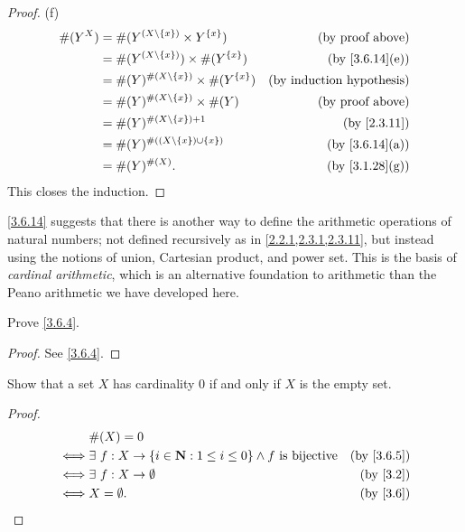\begin{proof}{(f)}
  \begin{align*}
    \#(Y^X) & = \#(Y^{(X \setminus \{x\})} \times Y^{\{x\}})       & \text{(by proof above)}          \\
            & = \#(Y^{(X \setminus \{x\})}) \times \#(Y^{\{x\}})   & \text{(by \cref{3.6.14}(e))}     \\
            & = \#(Y)^{\#(X \setminus \{x\})} \times \#(Y^{\{x\}}) & \text{(by induction hypothesis)} \\
            & = \#(Y)^{\#(X \setminus \{x\})} \times \#(Y)         & \text{(by proof above)}          \\
            & = \#(Y)^{\#(X \setminus \{x\}) + 1}                  & \text{(by \cref{2.3.11})}        \\
            & = \#(Y)^{\#((X \setminus \{x\}) \cup \{x\})}         & \text{(by \cref{3.6.14}(a))}     \\
            & = \#(Y)^{\#(X)}.                                     & \text{(by \cref{3.1.28}(g))}
  \end{align*}
  This closes the induction.
\end{proof}

\begin{remark}\label{3.6.15}
  \cref{3.6.14} suggests that there is another way to define the arithmetic operations of natural numbers;
  not defined recursively as in \cref{2.2.1,2.3.1,2.3.11}, but instead using the notions of union, Cartesian product, and power set.
  This is the basis of \emph{cardinal arithmetic}, which is an alternative foundation to arithmetic than the Peano arithmetic we have developed here.
\end{remark}

\exercisesection

\begin{exercise}\label{ex 3.6.1}
  Prove \cref{3.6.4}.
\end{exercise}

\begin{proof}
  See \cref{3.6.4}.
\end{proof}

\begin{exercise}\label{ex 3.6.2}
  Show that a set \(X\) has cardinality \(0\) if and only if \(X\) is the empty set.
\end{exercise}

\begin{proof}
  \begin{align*}
         & \#(X) = 0                                                                                                 \\
    \iff & \exists\ f : X \to \{i \in \N : 1 \leq i \leq 0\} \land f \text{ is bijective} & \text{(by \cref{3.6.5})} \\
    \iff & \exists\ f : X \to \emptyset                                                   & \text{(by \cref{3.2})}   \\
    \iff & X = \emptyset.                                                                 & \text{(by \cref{3.6})}
  \end{align*}
\end{proof}


